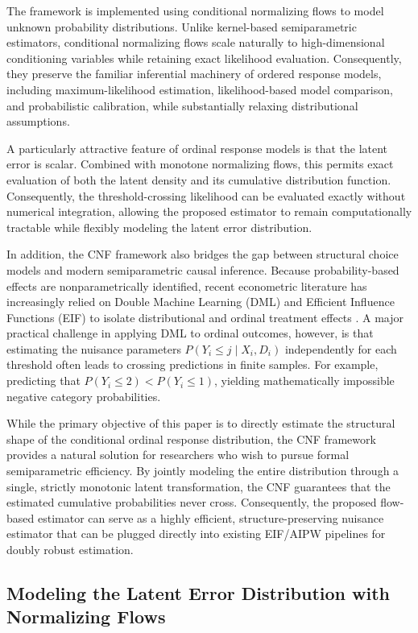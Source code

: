 \documentclass{article}
\begin{document}
The framework is implemented using conditional normalizing flows to model unknown probability distributions. Unlike kernel-based semiparametric estimators, conditional normalizing flows scale naturally to high-dimensional conditioning variables while retaining exact likelihood evaluation. Consequently, they preserve the familiar inferential machinery of ordered response models, including maximum-likelihood estimation, likelihood-based model comparison, and probabilistic calibration, while substantially relaxing distributional assumptions.

A particularly attractive feature of ordinal response models is that the latent error is scalar. Combined with monotone normalizing flows, this permits exact evaluation of both the latent density and its cumulative distribution function. Consequently, the threshold-crossing likelihood can be evaluated exactly without numerical integration, allowing the proposed estimator to remain computationally tractable while flexibly modeling the latent error distribution.

In addition, the CNF framework also bridges the gap between structural choice models and modern semiparametric causal inference. Because probability-based effects are nonparametrically identified, recent econometric literature has increasingly relied on Double Machine Learning (DML) and Efficient Influence Functions (EIF) to isolate distributional and ordinal treatment effects \citep{Chernozhukov2013b}. A major practical challenge in applying DML to ordinal outcomes, however, is that estimating the nuisance parameters $P(Y_i \le j \mid X_i, D_i)$ independently for each threshold often leads to crossing predictions in finite samples. For example, predicting that $P(Y_i \le 2) < P(Y_i \le 1)$, yielding mathematically impossible negative category probabilities.

While the primary objective of this paper is to directly estimate the structural shape of the conditional ordinal response distribution, the CNF framework provides a natural solution for researchers who wish to pursue formal semiparametric efficiency. By jointly modeling the entire distribution through a single, strictly monotonic latent transformation, the CNF guarantees that the estimated cumulative probabilities never cross. Consequently, the proposed flow-based estimator can serve as a highly efficient, structure-preserving nuisance estimator that can be plugged directly into existing EIF/AIPW pipelines for doubly robust estimation.


\subsection{Modeling the Latent Error Distribution with Normalizing Flows}
\label{subsec:flow}
\end{document}
